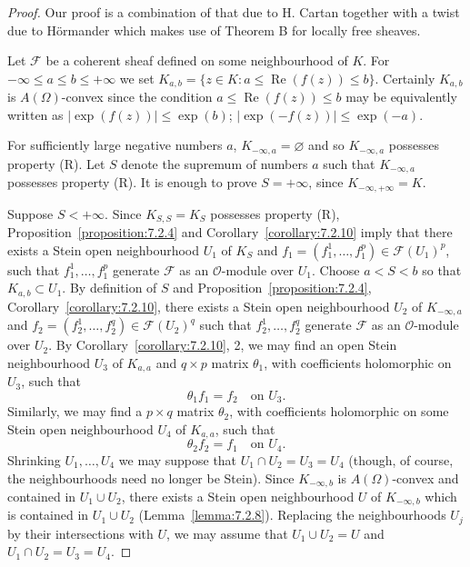 \begin{proof}
Our proof is a combination of that due to H. Cartan together with a twist due to H\"ormander \cite{bib:II:hormander-l:1} which makes use of Theorem B for locally free sheaves.

Let $\mathcal F$ be a coherent sheaf defined on some neighbourhood of $K$. For $-\infty\leq a\leq b\leq+\infty$ we set $K_{a,b}=\{z\in K:a\leq\operatorname{Re}(f(z))\leq b\}$. Certainly $K_{a,b}$ is $A(\Omega)$-convex since the condition $a\leq\operatorname{Re}(f(z))\leq b$ may be equivalently written as $|\exp(f(z))|\leq\exp(b)$; $|\exp(-f(z))|\leq\exp(-a)$.

For sufficiently large negative numbers $a$, $K_{-\infty,a}=\varnothing$ and so $K_{-\infty,a}$ possesses property (R). Let $S$ denote the supremum of numbers $a$ such that $K_{-\infty,a}$ possesses property (R). It is enough to prove $S=+\infty$, since $K_{-\infty,+\infty}=K$.

Suppose $S<+\infty$. Since $K_{S,S}=K_S$ possesses property (R), Proposition~\ref{proposition:7.2.4} and Corollary~\ref{corollary:7.2.10} imply that there exists a Stein open neighbourhood $U_1$ of $K_S$ and $f_1=(f_1^1,\ldots,f_1^p)\in\mathcal F(U_1)^p$, such that $f_1^1,\ldots,f_1^p$ generate $\mathcal F$ as an $\mathcal O$-module over $U_1$. Choose $a<S<b$ so that $K_{a,b}\subset U_1$. By definition of $S$ and Proposition~\ref{proposition:7.2.4}, Corollary~\ref{corollary:7.2.10}, there exists a Stein open neighbourhood $U_2$ of $K_{-\infty,a}$ and $f_2=(f_2^1,\ldots,f_2^q)\in\mathcal F(U_2)^q$ such that $f_2^1,\ldots,f_2^q$ generate $\mathcal F$ as an $\mathcal O$-module over $U_2$. By Corollary~\ref{corollary:7.2.10}, 2, we may find an open Stein neighbourhood $U_3$ of $K_{a,a}$ and $q\times p$ matrix $\theta_1$, with coefficients holomorphic on $U_3$, such that
\[
\theta_1f_1=f_2\quad\text{on }U_3.
\]
Similarly, we may find a $p\times q$ matrix $\theta_2$, with coefficients holomorphic on some Stein open neighbourhood $U_4$ of $K_{a,a}$, such that
\[
\theta_2f_2=f_1\quad\text{on }U_4.
\]
Shrinking $U_1,\ldots,U_4$ we may suppose that $U_1\cap U_2=U_3=U_4$ (though, of course, the neighbourhoods need no longer be Stein). Since $K_{-\infty,b}$ is $A(\Omega)$-convex and contained in $U_1\cup U_2$, there exists a Stein open neighbourhood $U$ of $K_{-\infty,b}$ which is contained in $U_1\cup U_2$ (Lemma~\ref{lemma:7.2.8}). Replacing the neighbourhoods $U_j$ by their intersections with $U$, we may assume that $U_1\cup U_2=U$ and $U_1\cap U_2=U_3=U_4$.


\end{proof}
